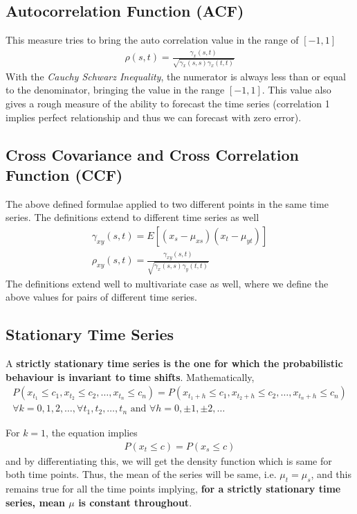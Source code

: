 \documentclass[../../time_series_notes.tex]{subfiles}
\begin{document}
\subsection{Autocorrelation Function (ACF)}
This measure tries to bring the auto correlation value in the range of $[-1,1]$
\begin{align*}
    \rho(s,t) = \frac{\gamma_{x}(s,t)}{\sqrt{\gamma_{x}(s,s) \gamma_{x}(t,t)}}
\end{align*}
With the \emph{Cauchy Schwarz Inequality}, the numerator is always less than or equal to the denominator, bringing the value in the range $[-1,1]$. This value also gives a rough measure of the ability to forecast the time series (correlation 1 implies perfect relationship and thus we can forecast with zero error).

\subsection{Cross Covariance and Cross Correlation Function (CCF)}
The above defined formulae applied to two different points in the same time series. The definitions extend to different time series as well
\begin{align*}
    \gamma_{xy}(s,t) = E[(x_{s} - \mu_{xs})(x_{t} - \mu_{yt})]\\
    \rho_{xy}(s,t) = \frac{\gamma_{xy}(s,t)}{\sqrt{\gamma_{x}(s,s) \gamma_{y}(t,t)}}
\end{align*}
The definitions extend well to multivariate case as well, where we define the above values for pairs of different time series.


\subsection{Stationary Time Series}
A \textbf{strictly stationary time series is the one for which the probabilistic behaviour is invariant to time shifts}. Mathematically,
\begin{gather*}
    P(x_{t_{1}} \leq c_{1}, x_{t_{2}} \leq c_{2}, \ldots, x_{t_{n}} \leq c_{n}) = P(x_{t_{1}+h} \leq c_{1}, x_{t_{2}+h} \leq c_{2}, \ldots, x_{t_{n}+h} \leq c_{n})\\
\forall k = 0,1,2,\ldots, \forall t_{1}, t_{2}, \ldots, t_{n} \text{ and } \forall h = 0, \pm 1, \pm 2, \ldots
\end{gather*}

For $k = 1$, the equation implies
\begin{align*}
    P(x_{t} \leq c) = P(x_{s} \leq c)
\end{align*}
and by differentiating this, we will get the density function which is same for both time points. Thus, the mean of the series will be same, i.e. $\mu_{t} = \mu_{s}$, and this remains true for all the time points implying, \textbf{for a strictly stationary time series, mean $\mu$ is constant throughout}.\newline
\end{document}
